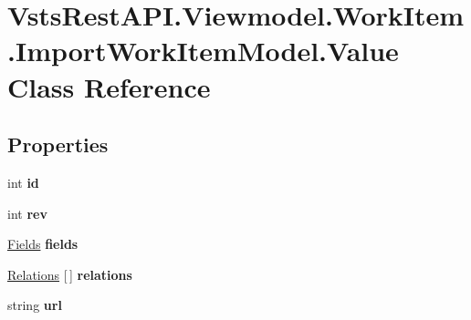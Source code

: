 \hypertarget{class_vsts_rest_a_p_i_1_1_viewmodel_1_1_work_item_1_1_import_work_item_model_1_1_value}{}\section{Vsts\+Rest\+A\+P\+I.\+Viewmodel.\+Work\+Item.\+Import\+Work\+Item\+Model.\+Value Class Reference}
\label{class_vsts_rest_a_p_i_1_1_viewmodel_1_1_work_item_1_1_import_work_item_model_1_1_value}
\subsection*{Properties}
\begin{DoxyCompactItemize}
\item 
\mbox{\label{class_vsts_rest_a_p_i_1_1_viewmodel_1_1_work_item_1_1_import_work_item_model_1_1_value_aac0da0a306ab1c3712c61b8bca7597cd}} 
int {\bfseries id}
\item 
\mbox{\label{class_vsts_rest_a_p_i_1_1_viewmodel_1_1_work_item_1_1_import_work_item_model_1_1_value_af8316b53120f94ba8b404360c7702ddd}} 
int {\bfseries rev}
\item 
\mbox{\label{class_vsts_rest_a_p_i_1_1_viewmodel_1_1_work_item_1_1_import_work_item_model_1_1_value_ae774423a23c965b7b06b1337245102ab}} 
\mbox{\hyperlink{class_vsts_rest_a_p_i_1_1_viewmodel_1_1_work_item_1_1_import_work_item_model_1_1_fields}{Fields}} {\bfseries fields}
\item 
\mbox{\label{class_vsts_rest_a_p_i_1_1_viewmodel_1_1_work_item_1_1_import_work_item_model_1_1_value_add03237e31255cbf6a45cc17b81124ac}} 
\mbox{\hyperlink{class_vsts_rest_a_p_i_1_1_viewmodel_1_1_work_item_1_1_import_work_item_model_1_1_relations}{Relations}} \mbox{[}$\,$\mbox{]} {\bfseries relations}
\item 
\mbox{\label{class_vsts_rest_a_p_i_1_1_viewmodel_1_1_work_item_1_1_import_work_item_model_1_1_value_aa0e385ffcfb4a57a36c11e1822cbc5a9}} 
string {\bfseries url}
\end{DoxyCompactItemize}


